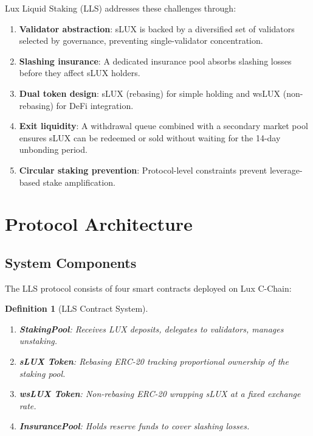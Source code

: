 \documentclass[11pt,a4paper]{article}
\newtheorem{definition}{Definition}
\begin{document}
Lux Liquid Staking (LLS) addresses these challenges through:

\begin{enumerate}[label=(\roman*)]
    \item \textbf{Validator abstraction}: sLUX is backed by a diversified set of validators selected by governance, preventing single-validator concentration.
    \item \textbf{Slashing insurance}: A dedicated insurance pool absorbs slashing losses before they affect sLUX holders.
    \item \textbf{Dual token design}: sLUX (rebasing) for simple holding and wsLUX (non-rebasing) for DeFi integration.
    \item \textbf{Exit liquidity}: A withdrawal queue combined with a secondary market pool ensures sLUX can be redeemed or sold without waiting for the 14-day unbonding period.
    \item \textbf{Circular staking prevention}: Protocol-level constraints prevent leverage-based stake amplification.
\end{enumerate}

\section{Protocol Architecture}\label{sec:architecture}

\subsection{System Components}

The LLS protocol consists of four smart contracts deployed on Lux C-Chain:

\begin{definition}[LLS Contract System]
\begin{enumerate}
    \item \textbf{StakingPool}: Receives LUX deposits, delegates to validators, manages unstaking.
    \item \textbf{sLUX Token}: Rebasing ERC-20 tracking proportional ownership of the staking pool.
    \item \textbf{wsLUX Token}: Non-rebasing ERC-20 wrapping sLUX at a fixed exchange rate.
    \item \textbf{InsurancePool}: Holds reserve funds to cover slashing losses.
\end{enumerate}
\end{definition}
\end{document}
